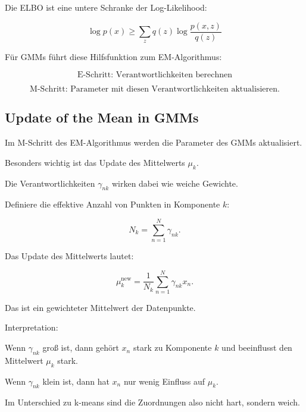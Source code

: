 \documentclass[11pt,a4paper]{scrartcl}
\begin{document}
\begin{answerbox}
    Die ELBO ist eine untere Schranke der Log-Likelihood:

    \[
        \boxed{
            \log p(x)
            \geq
            \sum_z
            q(z)
            \log
            \frac{p(x,z)}{q(z)}
        }
    \]

    Für GMMs führt diese Hilfsfunktion zum EM-Algorithmus:

    \[
        \boxed{
            \text{E-Schritt: Verantwortlichkeiten berechnen}
        }
    \]

    \[
        \boxed{
            \text{M-Schritt: Parameter mit diesen Verantwortlichkeiten aktualisieren.}
        }
    \]
\end{answerbox}

\subsection{Update of the Mean in GMMs}

\begin{notebox}
    Im M-Schritt des EM-Algorithmus werden die Parameter des GMMs aktualisiert.

    Besonders wichtig ist das Update des Mittelwerts \(\mu_k\).

    Die Verantwortlichkeiten \(\gamma_{nk}\) wirken dabei wie weiche Gewichte.
\end{notebox}

\begin{calculationbox}
    Definiere die effektive Anzahl von Punkten in Komponente \(k\):

    \[
        N_k
        =
        \sum_{n=1}^{N}
        \gamma_{nk}.
    \]

    Das Update des Mittelwerts lautet:

    \[
        \mu_k^{\mathrm{new}}
        =
        \frac{1}{N_k}
        \sum_{n=1}^{N}
        \gamma_{nk}x_n.
    \]

    Das ist ein gewichteter Mittelwert der Datenpunkte.
\end{calculationbox}

\begin{solutionbox}
    Interpretation:

    Wenn \(\gamma_{nk}\) groß ist, dann gehört \(x_n\) stark zu Komponente \(k\)
    und beeinflusst den Mittelwert \(\mu_k\) stark.

    Wenn \(\gamma_{nk}\) klein ist, dann hat \(x_n\) nur wenig Einfluss auf
    \(\mu_k\).

    Im Unterschied zu k-means sind die Zuordnungen also nicht hart, sondern
    weich.
\end{solutionbox}
\end{document}
